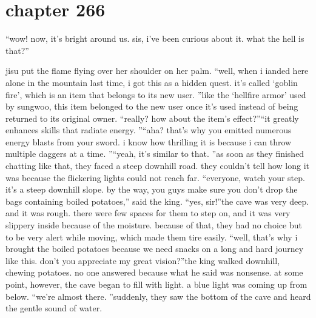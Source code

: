 \section{chapter 266}

                            “wow! now, it’s bright around us.
 sis, i’ve been curious about it.
 what the hell is that?”




jisu put the flame flying over her shoulder on her palm.
“well, when i ianded here alone in the mountain last time, i got this as a hidden quest.
 it’s called ‘goblin fire’, which is an item that belongs to its new user.
”like the ‘hellfire armor’ used by sungwoo, this item belonged to the new user once it’s used instead of being returned to its original owner.
“really? how about the item’s effect?”“it greatly enhances skills that radiate energy.
”“aha? that’s why you emitted numerous energy blasts from your sword.
 i know how thrilling it is because i can throw multiple daggers at a time.
”“yeah, it’s similar to that.
”as soon as they finished chatting like that, they faced a steep downhill road.
 they couldn’t tell how long it was because the flickering lights could not reach far.
“everyone, watch your step.
 it’s a steep downhill slope.
 by the way, you guys make sure you don’t drop the bags containing boiled potatoes,” said the king.
“yes, sir!”the cave was very deep.
 and it was rough.
 there were few spaces for them to step on, and it was very slippery inside because of the moisture.
 because of that, they had no choice but to be very alert while moving, which made them tire easily.
“well, that’s why i brought the boiled potatoes because we need snacks on a long and hard journey like this.
 don’t you appreciate my great vision?”the king walked downhill, chewing potatoes.
 no one answered because what he said was nonsense.
at some point, however, the cave began to fill with light.
 a blue light was coming up from below.
“we’re almost there.
”suddenly, they saw the bottom of the cave and heard the gentle sound of water.

